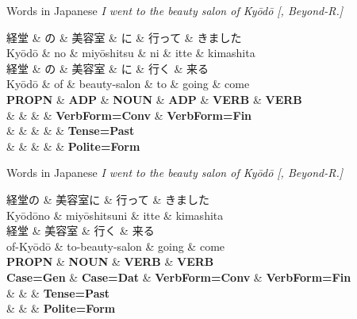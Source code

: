 \documentclass[10pt, compress, aspectratio=169]{beamer}
\newcommand{\upos}[1]{\textbf{\color{blue}#1}}
\newcommand{\feat}[1]{\textbf{\footnotesize\color{red}#1}}
\newcommand{\zh}[1]{{\jafont #1}}
\begin{document}
\begin{frame}{Words in Japanese}
\textit{I went to the beauty salon of Kyōdō [, Beyond-R.]}

\begin{dependency}[label style={thick, font=\bfseries}]
\begin{deptext}[font=\bfseries]
\zh{経堂} \& \zh{の} \& \zh{美容室} \& \zh{に} \& \zh{行って} \& \zh{きました} \\
Kyōdō \& no \& miyōshitsu \& ni \& itte \& kimashita \\
\zh{経堂} \& \zh{の} \& \zh{美容室} \& \zh{に} \& \zh{行く} \& \zh{来る} \\
Kyōdō \& of \& beauty-salon \& to \& going \& come \\
\upos{PROPN} \& \upos{ADP} \& \upos{NOUN} \& \upos{ADP} \& \upos{VERB} \& \upos{VERB} \\
\& \& \& \& \feat{VerbForm=Conv} \& \feat{VerbForm=Fin} \\
\& \& \& \& \& \feat{Tense=Past} \\
\& \& \& \& \& \feat{Polite=Form} \\
\end{deptext}
\end{dependency}
\end{frame}



\begin{frame}{Words in Japanese}
\textit{I went to the beauty salon of Kyōdō [, Beyond-R.]}

\begin{dependency}[label style={thick, font=\bfseries}]
\begin{deptext}[font=\bfseries]
\zh{経堂の} \& \zh{美容室に} \& \zh{行って} \& \zh{きました} \\
Kyōdōno \& miyōshitsuni \& itte \& kimashita \\
\zh{経堂} \& \zh{美容室} \& \zh{行く} \& \zh{来る} \\
of-Kyōdō \& to-beauty-salon \& going \& come \\
\upos{PROPN} \& \upos{NOUN} \& \upos{VERB} \& \upos{VERB} \\
\feat{Case=Gen} \& \feat{Case=Dat} \& \feat{VerbForm=Conv} \& \feat{VerbForm=Fin} \\
\& \& \& \feat{Tense=Past} \\
\& \& \& \feat{Polite=Form} \\
\end{deptext}
\end{dependency}
\end{frame}
\end{document}
